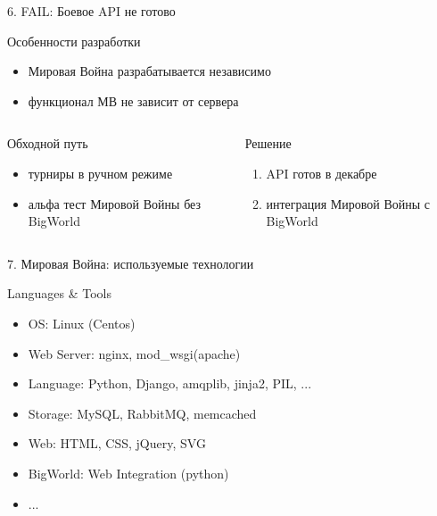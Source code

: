 \documentclass{beamer}
\begin{document}
\begin{frame}{6. FAIL: Боевое API не готово}
    \begin{block}{Особенности разработки}
        \begin{itemize}
            \item{Мировая Война разрабатывается независимо}
            \item{функционал МВ не зависит от сервера}
        \end{itemize}
    \end{block}
    
    \begin{columns}
            \pause
            \begin{block}{Обходной путь}
                \begin{itemize}
                    \item{турниры в ручном режиме}
                    \item{альфа тест Мировой Войны без BigWorld}
                \end{itemize}
            \end{block}

            \pause
            \begin{block}{Решение}
                \begin{enumerate}
                    \item{API готов в декабре}
                    \item{интеграция Мировой Войны с BigWorld}
                \end{enumerate}
             \end{block}
    \end{columns}
\end{frame}

\begin{frame}{7. Мировая Война: используемые технологии}
    \begin{block}{Languages \& Tools}
        \begin{itemize}
            \item{OS: Linux (Centos)}
            \item{Web Server: nginx, mod\_wsgi(apache)}
            \item{Language: Python, Django, amqplib, jinja2, PIL, ...}
            \item{Storage: MySQL, RabbitMQ, memcached}
            \item{Web: HTML, CSS, jQuery, SVG}
            \item{BigWorld: Web Integration (python)}
            \item{...}
        \end{itemize}
    \end{block}
\end{frame}
\end{document}
